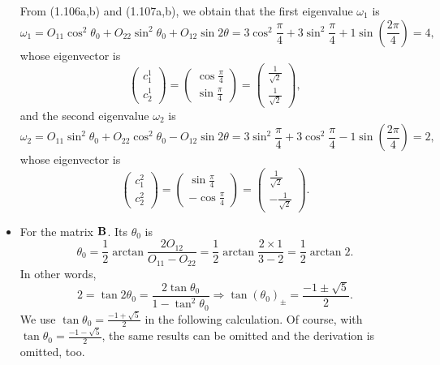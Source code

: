 \documentclass[a4paper]{book}
\newcounter{solution}[chapter]
\newcommand{\B}{{\bf B}}
\begin{document}
\begin{solution}
\begin{itemize}
	From (1.106a,b) and (1.107a,b), we obtain that the first eigenvalue $\omega_1$ is
	\[
		\omega_1 = O_{11} \cos^2 \theta_0 + O_{22} \sin^2 \theta_0 + O_{12} \sin 2\theta = 3 \cos^2 \frac{\pi}{4} + 3 \sin^2 \frac{\pi}{4} + 1 \sin \left( \frac{2 \pi}{4} \right) = 4 ,
	\]
	whose eigenvector is
	\[
		\begin{pmatrix}
			c^1_1 \\ c^1_2 
		\end{pmatrix} = \begin{pmatrix}
			\cos \frac{\pi}{4} \\ \sin \frac{\pi}{4}
		\end{pmatrix} = \begin{pmatrix}
			\frac{1}{ \sqrt{2} } \\ \frac{1}{ \sqrt{2} }
		\end{pmatrix} ,
	\]
	and the second eigenvalue $\omega_2$ is
	\[
		\omega_2 = O_{11} \sin^2 \theta_0 + O_{22} \cos^2 \theta_0 - O_{12} \sin 2\theta = 3 \sin^2 \frac{\pi}{4} + 3 \cos^2 \frac{\pi}{4} - 1 \sin \left( \frac{2 \pi}{4} \right) = 2 ,
	\]
	whose eigenvector is
	\[
		\begin{pmatrix}
			c^2_1 \\ c^2_2 
		\end{pmatrix} = \begin{pmatrix}
			\sin \frac{\pi}{4} \\ -\cos \frac{\pi}{4}
		\end{pmatrix} = \begin{pmatrix}
			\frac{1}{ \sqrt{2} } \\ -\frac{1}{ \sqrt{2} }
		\end{pmatrix} .
	\]
	
	\item For the matrix $\B$. Its $\theta_0$ is
	\[
		\theta_0 = \frac{1}{2} \arctan{\frac{ 2O_{12} }{ O_{11} - O_{22} } } = \frac{1}{2} \arctan{ \frac{ 2 \times 1 }{ 3 - 2 } } = \frac{1}{2} \arctan{ 2 } .
	\]
	In other words, 
	\[
		2 = \tan 2\theta_0 = \frac{ 2 \tan \theta_0 }{ 1 - \tan^2 \theta_0 } \Rightarrow \tan (\theta_0)_\pm = \frac{ -1 \pm \sqrt{5} }{2}. 
	\]
	We use $\tan \theta_0 = \frac{ -1 + \sqrt{5} }{2}$ in the following calculation. Of course, with $\tan \theta_0 = \frac{ -1 - \sqrt{5} }{2}$, the same results can be omitted and the derivation is omitted, too.
	

\end{itemize}
\end{solution}
\end{document}
